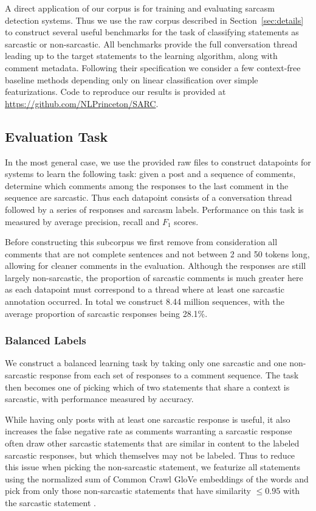 \documentclass[10pt, a4paper]{article}
\begin{document}
A direct application of our corpus is for training and evaluating sarcasm detection systems.
Thus we use the raw corpus described in Section~\ref{sec:details} to construct several useful benchmarks for the task of classifying statements as sarcastic or non-sarcastic.
All benchmarks provide the full conversation thread leading up to the target statements to the learning algorithm, along with comment metadata.
Following their specification we consider a few context-free baseline methods depending only on linear classification over simple featurizations.
Code to reproduce our results is provided at \url{https://github.com/NLPrinceton/SARC}.

\subsection{Evaluation Task}
\label{subsec:task}

In the most general case, we use the provided raw files to construct datapoints for systems to learn the following task: given a post and a sequence of comments, determine which comments among the responses to the last comment in the sequence are sarcastic.
Thus each datapoint consists of a conversation thread followed by a series of responses and sarcasm labels.
Performance on this task is measured by average precision, recall and $F_1$ scores.

Before constructing this subcorpus we first remove from consideration all comments that are not complete sentences and not between 2 and 50 tokens long, allowing for cleaner comments in the evaluation. 
Although the responses are still largely non-sarcastic, the proportion of sarcastic comments is much greater here as each datapoint must correspond to a thread where at least one sarcastic annotation occurred.
In total we construct 8.44 million sequences, with the average proportion of sarcastic responses being 28.1\%.

\subsubsection{Balanced Labels}
We construct a balanced learning task by taking only one sarcastic and one non-sarcastic response from each set of responses to a comment sequence.
The task then becomes one of picking which of two statements that share a context is sarcastic, with performance measured by accuracy.

While having only posts with at least one sarcastic response is useful, it also increases the false negative rate as comments warranting a sarcastic response often draw other sarcastic statements that are similar in content to the labeled sarcastic responses, but which themselves may not be labeled.
Thus to reduce this issue when picking the non-sarcastic statement, we featurize all statements using the normalized sum of Common Crawl GloVe embeddings of the words and pick from only those non-sarcastic statements that have similarity $\le0.95$ with the sarcastic statement \cite{Pennington:14}. 
\end{document}

